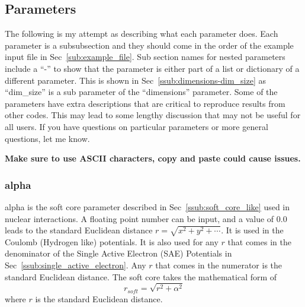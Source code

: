\documentclass{article}
\begin{document}
\subsection{Parameters} %
\label{sub:parameters_input}
The following is my attempt as describing what each parameter does. Each parameter is a subsubsection and they should come in the order of the example input file in Sec~\ref{sub:example_file}. Sub section names for nested parameters include a ``-'' to show that the parameter is either part of a list or dictionary of a different parameter. This is shown in Sec~\ref{ssub:dimensions-dim_size} as ``dim\_size'' is a sub parameter of the ``dimensions'' parameter.  Some of the parameters have extra descriptions that are critical to reproduce results from other codes. This may lead to some lengthy discussion that may not be useful for all users. If you have questions on particular parameters or more general questions, let me know.

\textbf{Make sure to use ASCII characters, copy and paste could cause issues.}

\subsubsection{alpha}
alpha is the soft core parameter described in Sec~\ref{ssub:soft_core_like} used in nuclear interactions. A floating point number can be input, and a value of 0.0 leads to the standard Euclidean distance $r=\sqrt{x^2+y^2+\cdots}$. It is used in the Coulomb (Hydrogen like) potentials. It is also used for any $r$ that comes in the denominator of the Single Active Electron (SAE) Potentials in Sec~\ref{ssub:single_active_electron}. Any $r$ that comes in the numerator is the standard Euclidean distance. The soft core takes the mathematical form of
\begin{equation}
  r_{soft} = \sqrt{r^2 + \alpha^2}
\end{equation}
where $r$ is the standard Euclidean distance.
\end{document}
